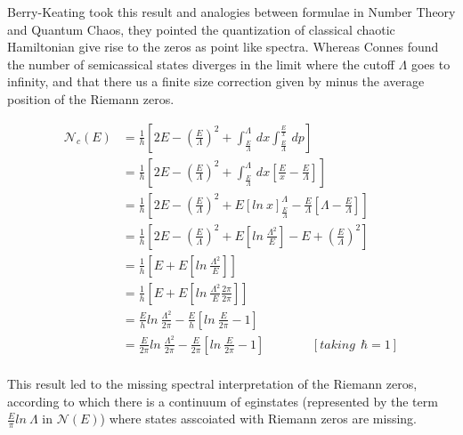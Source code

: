 \documentclass[12pt]{report}
\newcommand*{\1}{\hspace{1pt}}
\begin{document}
    Berry-Keating took this result and analogies between formulae in Number Theory and Quantum Chaos, they pointed the quantization of classical chaotic Hamiltonian give
    rise to the zeros as point like spectra.\cite{s1,s4} Whereas Connes found the number of semicassical states diverges in the limit where the cutoff $\Lambda$ goes to
    infinity, and that there us a finite size correction given by minus the average position of the Riemann zeros.

    \begin{equation}
        \begin{split}
            \mathcal {N}_{c} (E) &= \frac{1}{h}\left[ 2E - \left(\frac{E}{\Lambda} \right)^{2} + \int_{\frac{E}{\Lambda}}^{\Lambda}  \,dx\int^{\frac{E}{x}}_{\frac{E}{\Lambda}}  \,dp   \right] \\ 
             & = \frac{1}{h}\left[ 2E - \left(\frac{E}{\Lambda} \right)^{2} + \int_{\frac{E}{\Lambda}}^{\Lambda}  \,dx\left[\frac{E}{x} - \frac{E}{\Lambda}\right]   \right] \\ 
             & = \frac{1}{h}\left[ 2E - \left(\frac{E}{\Lambda} \right)^{2} + E\left[ln \ x\right] _{\frac{E}{\Lambda}}^{\Lambda} - \frac{E}{\Lambda}\left[\Lambda - \frac{E}{\Lambda}\right]   \right] \\ 
             & = \frac{1}{h}\left[ 2E - \left(\frac{E}{\Lambda} \right)^{2} + E\left[ln \ \frac{\Lambda ^{2}}{E}\right] - E + \left(\frac{E}{\Lambda}\right)^{2}\right]  \\ 
             & = \frac{1}{h}\left[ E  + E\left[ln \ \frac{\Lambda ^{2}}{E}\right] \right]  \\ 
             & = \frac{1}{h}\left[ E  + E\left[ln \ \frac{\Lambda ^{2}}{E}\frac{2\pi}{2\pi}\right] \right]  \\ 
             & = \frac{E}{h} ln \ \frac{\Lambda ^{2}}{2\pi} - \frac{E}{h} \left[ln \ \frac{E}{2\pi} - 1\right]  \\
             & = \frac{E}{2\pi} ln \ \frac{\Lambda ^{2}}{2\pi} - \frac{E}{2\pi} \left[ln \ \frac{E}{2\pi} - 1\right] \ \ \ \ \ \ \ \ \ \ \ \ \ \ \ \ \   [taking \ \ \hbar=1] \\
        \end{split} 
    \end{equation}

    This result led to the missing spectral interpretation of the Riemann zeros, according to which there is a continuum of eginstates (represented by the term $\frac{E}{\pi}
     ln \ \Lambda$ in $\mathcal {N} (E)$) where states asscoiated with Riemann zeros are missing.
\end{document}
